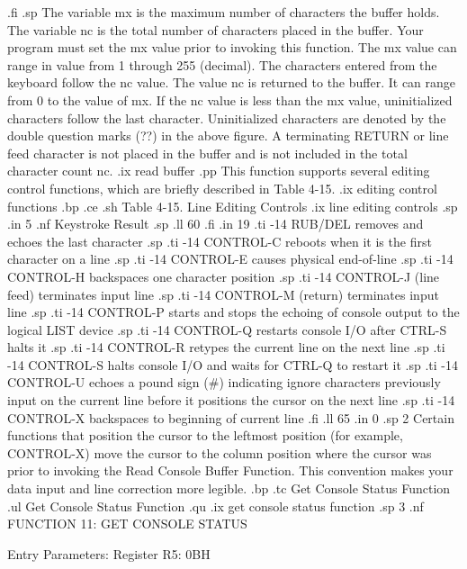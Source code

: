 .fi
.sp
The variable mx is the maximum number of characters the buffer holds. The
variable nc is the total number of characters placed in the buffer. Your
program must set the mx value prior to invoking this function. The mx value
can range in value from 1 through 255 (decimal).  The characters entered
from the keyboard follow the nc value.  The value nc is returned to the
buffer.  It can range from 0 to the value of mx.  If the nc value is less
than the mx value, uninitialized characters follow the last character.  
Uninitialized
characters are denoted by the double question marks (??) in the above
figure.  A terminating RETURN or line feed character is not placed in the
buffer and is not included in the total character count nc. 
.ix read buffer
.pp
This function supports several editing control functions, which 
are briefly described in Table 4-15. 
.ix editing control functions
.bp
.ce
.sh
Table 4-15.  Line Editing Controls
.ix line editing controls
.sp
.in 5 
.nf
Keystroke                      Result
.sp
.ll 60
.fi
.in 19
.ti -14
RUB/DEL       removes and echoes the last character
.sp 
.ti -14
CONTROL-C     reboots when it is the first character on a line
.sp 
.ti -14
CONTROL-E     causes physical end-of-line
.sp 
.ti -14
CONTROL-H     backspaces one character position
.sp 
.ti -14
CONTROL-J     (line feed) terminates input line
.sp 
.ti -14
CONTROL-M     (return) terminates input line
.sp 
.ti -14
CONTROL-P     starts and stops the echoing of console output to the logical 
LIST device 
.sp 
.ti -14
CONTROL-Q     restarts console I/O after CTRL-S halts it
.sp 
.ti -14
CONTROL-R     retypes the current line on the next line
.sp 
.ti -14
CONTROL-S     halts console I/O and waits for CTRL-Q to restart it
.sp 
.ti -14
CONTROL-U     echoes a pound sign (#) indicating ignore characters previously 
input on the current line before it positions the cursor on the next line 
.sp 
.ti -14
CONTROL-X     backspaces to beginning of current line
.fi
.ll 65
.in 0
.sp 2
Certain functions that position the cursor to the leftmost position 
(for example, CONTROL-X) move the cursor to the column position where the 
cursor 
was prior to invoking the Read Console Buffer Function.  This convention 
makes your data 
input and line correction more legible.
.bp
.tc                Get Console Status Function
.ul
Get Console Status Function 
.qu
.ix get console status function
.sp 3
.nf 
                FUNCTION 11:  GET CONSOLE STATUS

                Entry Parameters:
                   Register   R5:  0BH

